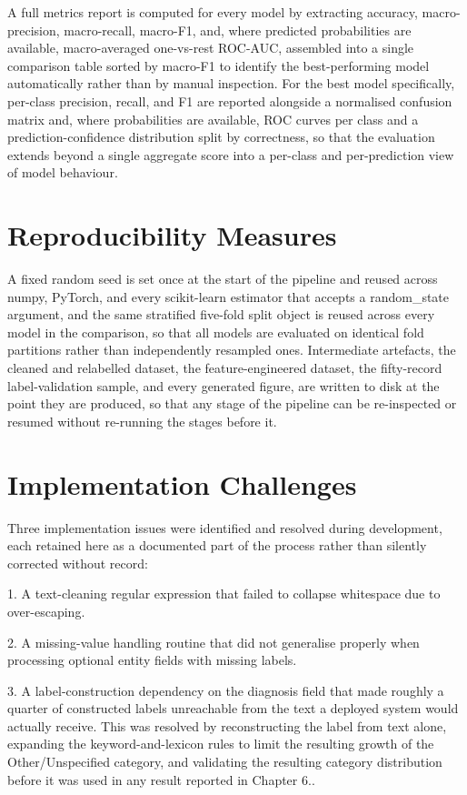 \documentclass[12pt,a4paper]{report}
\begin{document}
A full metrics report is computed for every model by extracting
accuracy, macro-precision, macro-recall, macro-F1, and, where predicted
probabilities are available, macro-averaged one-vs-rest ROC-AUC,
assembled into a single comparison table sorted by macro-F1 to identify
the best-performing model automatically rather than by manual
inspection. For the best model specifically, per-class precision,
recall, and F1 are reported alongside a normalised confusion matrix and,
where probabilities are available, ROC curves per class and a
prediction-confidence distribution split by correctness, so that the
evaluation extends beyond a single aggregate score into a per-class and
per-prediction view of model behaviour.
\section{Reproducibility
Measures}\label{reproducibility-measures}

A fixed random seed is set once at the start of the pipeline and reused
across numpy, PyTorch, and every scikit-learn estimator that accepts a
random\_state argument, and the same stratified five-fold split object
is reused across every model in the comparison, so that all models are
evaluated on identical fold partitions rather than independently
resampled ones. Intermediate artefacts, the cleaned and relabelled
dataset, the feature-engineered dataset, the fifty-record
label-validation sample, and every generated figure, are written to disk
at the point they are produced, so that any stage of the pipeline can be
re-inspected or resumed without re-running the stages before it.
\section{Implementation
Challenges}\label{implementation-challenges}

Three implementation issues were identified and resolved during
development, each retained here as a documented part of the process
rather than silently corrected without record:

1. A text-cleaning regular expression that failed to collapse whitespace
due to over-escaping.

2. A missing-value handling routine that did not generalise properly
when processing optional entity fields with missing labels.

3. A label-construction dependency on the diagnosis field that made
roughly a quarter of constructed labels unreachable from the text a
deployed system would actually receive. This was resolved by
reconstructing the label from text alone, expanding the
keyword-and-lexicon rules to limit the resulting growth of the
Other/Unspecified category, and validating the resulting category
distribution before it was used in any result reported in Chapter 6..
\end{document}

